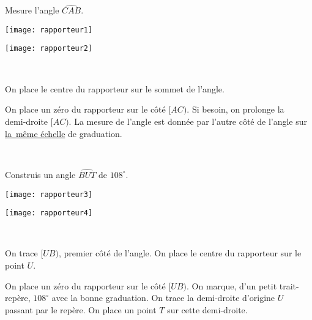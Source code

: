\begin{methode*1}

\begin{exemple*1}
Mesure l'angle $\widehat{CAB}$. \\[0.75em]

\begin{minipage}[c]{0.43\textwidth}
\centering
\texttt{[image: rapporteur1]}
\end{minipage}\hfill%
 \begin{minipage}[c]{0.53\textwidth}%
 \centering
 \texttt{[image: rapporteur2]}
  \end{minipage} \\
 \begin{minipage}[c]{0.43\textwidth}
On place le centre du rapporteur sur le sommet de l'angle.
\end{minipage} \hfill%
 \begin{minipage}[c]{0.53\textwidth}
 On place un zéro du rapporteur sur le côté $[AC)$. Si besoin, on prolonge la demi‑droite $[AC)$. La mesure de l'angle est donnée par l'autre côté de l'angle sur \underline{la même échelle} de graduation.
 \end{minipage} \\
  \end{exemple*1}
 
 \begin{exemple*1}
Construis un angle $\widehat{BUT}$ de $108^\circ$.  \\[0.75em]

\begin{minipage}[c]{0.43\textwidth}
\centering
\texttt{[image: rapporteur3]}
\end{minipage}\hfill%
 \begin{minipage}[c]{0.53\textwidth}%
 \centering
 \texttt{[image: rapporteur4]}
  \end{minipage} \\
 \begin{minipage}[c]{0.43\textwidth}
On trace $[UB)$, premier côté de l'angle. On place le centre du rapporteur sur le point $U$.
\end{minipage} \hfill%
 \begin{minipage}[c]{0.53\textwidth}
 On place un zéro du rapporteur sur le côté $[UB)$. On marque, d'un petit trait-repère, $108^\circ$ avec la bonne graduation.
On trace la demi‑droite d'origine $U$ passant par le repère. On place un point $T$ sur cette demi‑droite.
  \end{minipage} \\
  \end{exemple*1}
 

\end{methode*1}
